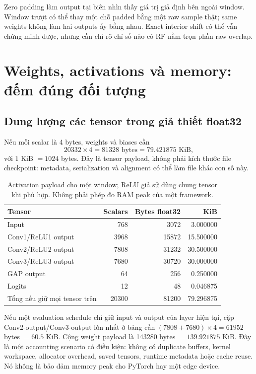 \documentclass[11pt,a4paper]{article}
\theoremstyle{definition}
\begin{document}
Zero padding làm output tại biên nhìn thấy giá trị giả định bên ngoài
window. Window trượt có thể thay một chỗ padded bằng một raw sample
thật; same weights không làm hai outputs ấy bằng nhau. Exact interior
shift có thể vẫn chứng minh được, nhưng cần chỉ rõ chỉ số nào có RF nằm
trọn phần raw overlap.

\section{Weights, activations và memory: đếm đúng đối tượng}
\subsection{Dung lượng các tensor trong giả thiết float32}
Nếu mỗi scalar là 4 bytes, weights và biases cần
\begin{equation}
20332\times4=81328\text{ bytes}=79.421875\text{ KiB},
\end{equation}
với $1$ KiB $=1024$ bytes. Đây là tensor payload, không phải kích thước
file checkpoint: metadata, serialization và alignment có thể làm file
khác con số này.

\begin{table}[!htbp]\centering\small
\caption{Activation payload cho một window; ReLU giả sử dùng chung tensor
khi phù hợp. Không phải phép đo RAM peak của một framework.}
\begin{tabularx}{\linewidth}{@{}Yrrr@{}}\toprule
Tensor & Scalars & Bytes float32 & KiB\\\midrule
Input &768&3072&3.000000\\
Conv1/ReLU1 output &3968&15872&15.500000\\
Conv2/ReLU2 output &7808&31232&30.500000\\
Conv3/ReLU3 output &7680&30720&30.000000\\
GAP output &64&256&0.250000\\
Logits &12&48&0.046875\\\midrule
Tổng nếu giữ mọi tensor trên &20300&81200&79.296875\\\bottomrule
\end{tabularx}
\end{table}
Nếu một evaluation schedule chỉ giữ input và output của layer hiện tại,
cặp Conv2-output/Conv3-output lớn nhất ở bảng cần
$(7808+7680)\times4=61952$ bytes $=60.5$ KiB. Cộng weight payload là
143280 bytes $=139.921875$ KiB. Đây là một accounting scenario có điều
kiện: không có duplicate buffers, kernel workspace, allocator overhead,
saved tensors, runtime metadata hoặc cache reuse. Nó không là bảo đảm
memory peak cho PyTorch hay một edge device.
\end{document}
